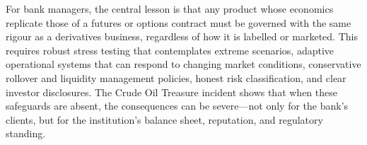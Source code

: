 \documentclass[a4paper,11pt]{article}
\begin{document}
For bank managers, the central lesson is that any product whose
economics replicate those of a futures or options contract must be
governed with the same rigour as a derivatives business, regardless
of how it is labelled or marketed. This requires robust stress
testing that contemplates extreme scenarios, adaptive operational
systems that can respond to changing market conditions, conservative
rollover and liquidity management policies, honest risk
classification, and clear investor disclosures. The Crude Oil
Treasure incident shows that when these safeguards are absent, the
consequences can be severe---not only for the bank's clients, but for
the institution's balance sheet, reputation, and regulatory standing.

\newpage



\end{document}
